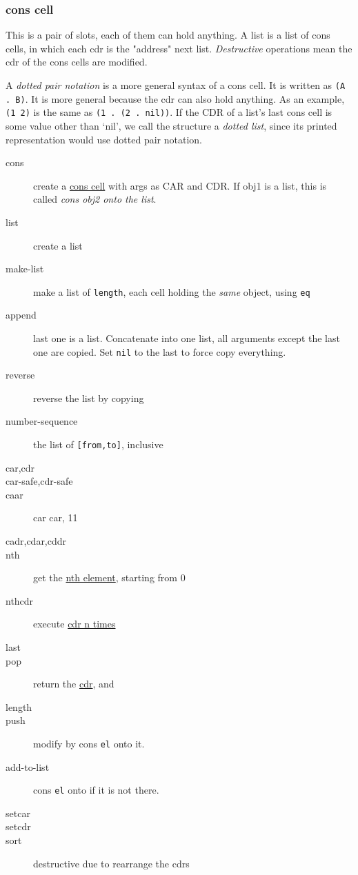 \subsubsection{cons cell}
This is a pair of slots, each of them can hold anything.  A list is a
list of cons cells, in which each cdr is the "address" next list.
\textit{Destructive} operations mean the cdr of the cons cells are
modified.

A \textit{dotted pair notation} is a more general syntax of a cons
cell.  It is written as \texttt{(A . B)}.  It is more general because
the cdr can also hold anything.  As an example, \texttt{(1 2)} is
the same as \verb$(1 . (2 . nil))$.  If the CDR of a list’s
last cons cell is some value other than ‘nil’, we call the structure a
\textit{dotted list}, since its printed representation would use
dotted pair notation.

\begin{description}
\item [cons ] create a \uline{cons cell} with args
  as CAR and CDR. If obj1 is a list, this is called \textit{cons obj2 onto the list}.
\item [list ] create a list
\item [make-list ] make a list of \texttt{length}, each
  cell holding the \textit{same} object, using \texttt{eq}
\item [append ] last one is a list. Concatenate into
  one list, all arguments except the last one are copied. Set
  \texttt{nil} to the last to force copy everything.
\item [reverse ] reverse the list by copying
\item [number-sequence ] the list of \texttt{[from,to]}, inclusive

\item [car,cdr]
\item [car-safe,cdr-safe]
\item [caar] car car, 11
\item [cadr,cdar,cddr]
\item [nth ] get the \uline{nth element}, starting from 0
\item [nthcdr ] execute \uline{cdr n times}
\item [last ]
\item [pop] return the \uline{cdr}, and 
\item [length]

\item [push ] modify  by cons \texttt{el} onto it.
\item [add-to-list ] cons \texttt{el} onto 
  if it is not there.
\item [setcar ]
\item [setcdr ]
\item [sort ] destructive due to rearrange the cdrs
\end{description}

